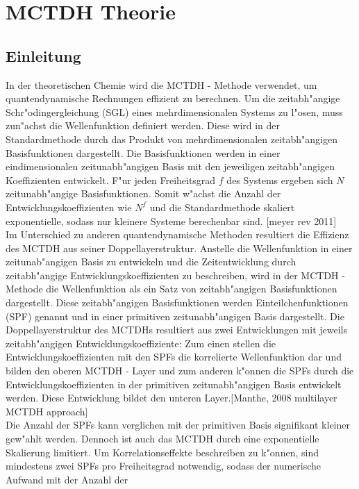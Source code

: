 \chapter{MCTDH Theorie}

\section{Einleitung}

In der theoretischen Chemie wird die MCTDH - Methode verwendet, um quantendynamische Rechnungen effizient zu berechnen.
Um die zeitabh"angige Schr"odingergleichung (SGL) eines mehrdimensionalen Systems zu l"osen, muss zun"achst die Wellenfunktion definiert werden.
Diese wird in der Standardmethode durch das Produkt von mehrdimensionalen zeitabh"angigen Basisfunktionen dargestellt. Die Basisfunktionen werden in
einer eindimensionalen zeitunabh"angigen Basis mit den jeweiligen zeitabh"angigen Koeffizienten entwickelt.
F"ur jeden Freiheitsgrad $f$ des Systems ergeben sich $N$ zeitunabh"angige Basisfunktionen. Somit w"achst die Anzahl der Entwicklungskoeffizienten wie $N^{f}$ und
die Standardmethode skaliert exponentielle, sodass nur kleinere Systeme berechenbar sind. [meyer rev 2011]
  \\ Im Unterschied zu anderen quantendynamische Methoden resultiert die Effizienz des MCTDH aus seiner Doppellayerstruktur.
Anstelle die Wellenfunktion in einer zeitunab"angigen Basis zu entwickeln und die Zeitentwicklung durch zeitabh"angige Entwicklungskoeffizienten zu beschreiben,
wird in der MCTDH - Methode die Wellenfunktion als ein Satz von zeitabh"angigen Basisfunktionen dargestellt.
Diese zeitabh"angigen Basisfunktionen werden Einteilchenfunktionen (SPF) genannt und in einer primitiven zeitunabh"angigen Basis dargestellt.
Die Doppellayerstruktur des MCTDHs resultiert aus zwei Entwicklungen mit jeweils zeitabh"angigen Entwicklungskoeffiziente:
Zum einen stellen die Entwicklungskoeffizienten mit den SPFs die korrelierte Wellenfunktion dar und bilden den oberen MCTDH -
Layer und zum anderen k"onnen die SPFs durch die Entwicklungskoeffizienten in der primitiven zeitunabh"angigen Basis entwickelt werden. Diese Entwicklung bildet
den unteren Layer.[Manthe, 2008 multilayer MCTDH approach]
  \\ Die Anzahl der SPFs kann verglichen mit der primitiven Basis signifikant kleiner gew"ahlt werden.
Dennoch ist auch das MCTDH durch eine exponentielle Skalierung limitiert.
Um Korrelationseffekte beschreiben zu k"onnen, sind mindestens zwei SPFs pro Freiheitsgrad notwendig, sodass der numerische Aufwand mit der Anzahl der
